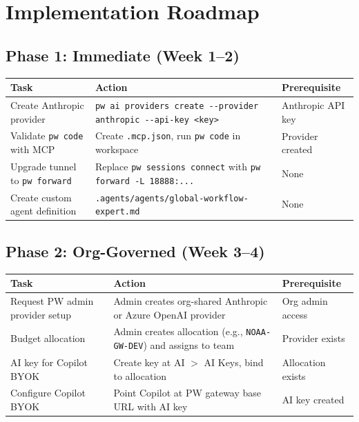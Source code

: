 \documentclass[11pt,letterpaper,twoside]{article}
\begin{document}
\section{Implementation Roadmap}
\label{sec:roadmap}

\subsection*{Phase 1: Immediate (Week 1--2)}

\begin{table}[H]
\centering\small
\begin{tabularx}{\textwidth}{L{4.0cm} X L{3.5cm}}
\toprule
\textbf{Task} & \textbf{Action} & \textbf{Prerequisite} \\
\midrule
Create Anthropic provider & \texttt{pw ai providers create -{}-provider anthropic -{}-api-key <key>} & Anthropic API key \\
Validate \texttt{pw code} with MCP & Create \texttt{.mcp.json}, run \texttt{pw code} in workspace & Provider created \\
Upgrade tunnel to \texttt{pw forward} & Replace \texttt{pw sessions connect} with \texttt{pw forward -L 18888:...} & None \\
Create custom agent definition & \texttt{.agents/agents/global-workflow-expert.md} & None \\
\bottomrule
\end{tabularx}
\end{table}

\subsection*{Phase 2: Org-Governed (Week 3--4)}

\begin{table}[H]
\centering\small
\begin{tabularx}{\textwidth}{L{4.0cm} X L{3.5cm}}
\toprule
\textbf{Task} & \textbf{Action} & \textbf{Prerequisite} \\
\midrule
Request PW admin provider setup & Admin creates org-shared Anthropic or Azure OpenAI provider & Org admin access \\
Budget allocation & Admin creates allocation (e.g., \texttt{NOAA-GW-DEV}) and assigns to team & Provider exists \\
AI key for Copilot BYOK & Create key at AI $>$ AI Keys, bind to allocation & Allocation exists \\
Configure Copilot BYOK & Point Copilot at PW gateway base URL with AI key & AI key created \\
\bottomrule
\end{tabularx}
\end{table}
\end{document}
